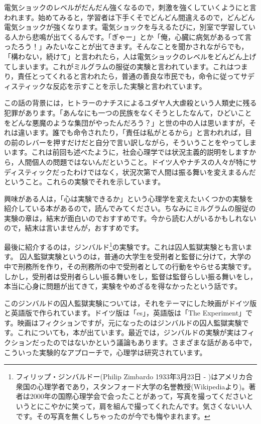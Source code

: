 \documentclass{ltjsbook}
\begin{document}
電気ショックのレベルがだんだん強くなるので，刺激を強くしていくようにと言われます。始めてみると，学習者は下手くそでどんどん間違えるので，どんどん電気ショックが強くなります。電気ショックを与えるたびに，別室で学習している人から悲鳴が出てくるんです。「ぎゃー」とか「俺，心臓に病気があるって言ったろう！」みたいなことが出てきます。そんなことを聞かされながらでも，「構わない，続けて」と言われたら，人は電気ショックのレベルをどんどん上げてしまいます。これがミルグラムの服従の実験と言われています。これはつまり，責任とってくれると言われたら，普通の善良な市民でも，命令に従ってサディスティックな反応を示すことを示した実験と言われています。

この話の背景には，ヒトラーのナチスによるユダヤ人大虐殺という人類史に残る犯罪があります。「あんなにも一つの民族をなくそうとしたなんて，ひどいことをどんな悪魔のような集団がやったんだろう？」と世の中の人は思いますが，それは違います。誰でも命令されたり，「責任は私がとるから」と言われれば，目の前のレバーを押すだけだと自分で言い訳しながら，そういうことをやってしまいます。これは前回も述べたように，社会心理学では状況主義的説明をしますから，人間個人の問題ではないんだということ。ドイツ人やナチスの人々が特にサディスティックだったわけではなく，状況次第で人間は振る舞いを変えまるんだということ。これらの実験でそれを示しています。

興味がある人は，「心は実験できるか」という心理学を変えたいくつかの実験を紹介している本があるので，読んでみてください\parencite{jikken2004}。ちなみにミルグラムの服従の実験の章は，結末が面白いのでおすすめです。今から読む人がいるかもしれないので，結末は言いませんが，おすすめです。

最後に紹介するのは，ジンバルド\footnote{フィリップ・ジンバルドー(Philip Zimbardo 1933年3月23日 - )はアメリカ合衆国の心理学者であり，スタンフォード大学の名誉教授(Wikipediaより)。著者は2000年の国際心理学会で会ったことがあって，写真を撮ってくださいというとにこやかに笑って，肩を組んで撮ってくれたんです。気さくないい人です。その写真を無くしちゃったのが今でも悔やまれます。}の実験です。これは囚人監獄実験とも言います。
囚人監獄実験というのは，普通の大学生を受刑者と監督に分けて，大学の中で刑務所を作り，その刑務所の中で受刑者としての行動をやらせる実験です。しかし，受刑者は受刑者らしい振る舞いをし，監督は監督らしい振る舞いをし，本当に心身に問題が出てきて，実験をやめざるを得なかったという話です。

このジンバルドの囚人監獄実験については，それをテーマにした映画がドイツ版と英語版で作られています。ドイツ版は「es」，英語版は「The Experiment」です。映画はフィクションですが，元になったのはジンバルドの囚人監獄実験です。これについても，本が出ています。最近では，ジンバルドの実験が実はフィクションだったのではないかという議論もあります。さまざまな話がある中で，こういった実験的なアプローチで，心理学は研究されています。
\end{document}
